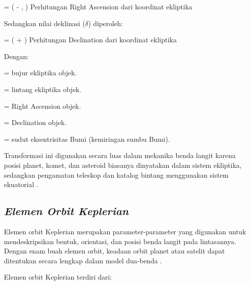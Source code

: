 \begin{equationcaptioned}[eq:2.transformasiRAakhir]{
		\alpha = 
		\left(
		\cos{\beta}\sin{\lambda}\cos{\varepsilon} - \sin{\beta}\sin{\varepsilon},
		\cos{\beta}\cos{\lambda}
		\right)
	}{
		Perhitungan Right Ascension dari koordinat ekliptika
	}
\end{equationcaptioned}

Sedangkan nilai deklinasi ($\delta$) diperoleh:

\begin{equationcaptioned}[eq:2.transformasiDekFinal]{
		\delta = \arcsin
		\left(
		\sin{\beta}\cos{\varepsilon} + \cos{\beta}\sin{\varepsilon}\sin{\lambda}
		\right)
	}{
		Perhitungan Declination dari koordinat ekliptika
	}
\end{equationcaptioned}

Dengan:
\begin{description}[noitemsep]
	\item[$\lambda$] = bujur ekliptika objek.
	\item[$\beta$] = lintang ekliptika objek.
	\item[$\alpha$] = Right Ascension objek.
	\item[$\delta$] = Declination objek.
	\item[$\varepsilon$] = sudut eksentrisitas Bumi (kemiringan sumbu Bumi).
\end{description}

Transformasi ini digunakan secara luas dalam mekanika benda langit karena posisi planet, komet, dan asteroid biasanya dinyatakan dalam sistem ekliptika, sedangkan pengamatan teleskop dan katalog bintang menggunakan sistem ekuatorial \cite{Roy2018}.

\subsection{\textit{Elemen Orbit Keplerian}} \label{II.TeoriElemenOrbit}

Elemen orbit Keplerian merupakan parameter-parameter yang digunakan untuk mendeskripsikan bentuk, orientasi, dan posisi benda langit pada lintasannya. Dengan enam buah elemen orbit, keadaan orbit planet atau satelit dapat ditentukan secara lengkap dalam model dua-benda \cite{Meeus1998}.

Elemen orbit Keplerian terdiri dari:

